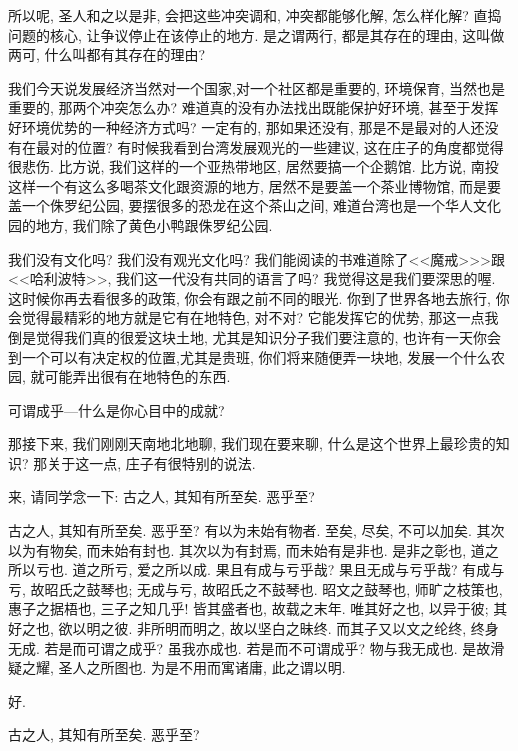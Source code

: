 \documentclass[11pt]{article}
\begin{document}
所以呢, {\color{blue} 圣人和之以是非}, 会把这些冲突调和, 冲突都能够化解, 怎么样化解? 直捣问题的核心, 让争议停止在该停止的地方. {\color{blue} 是之谓两行}, 都是其存在的理由, 这叫做两可, 什么叫都有其存在的理由? 

我们今天说发展经济当然对一个国家,对一个社区都是重要的, 环境保育, 当然也是重要的, 那两个冲突怎么办? 难道真的没有办法找出既能保护好环境, 甚至于发挥好环境优势的一种经济方式吗? 一定有的, 那如果还没有, 那是不是最对的人还没有在最对的位置? 有时候我看到台湾发展观光的一些建议, 这在庄子的角度都觉得很悲伤. 比方说, 我们这样的一个亚热带地区, 居然要搞一个企鹅馆. 比方说, 南投这样一个有这么多喝茶文化跟资源的地方, 居然不是要盖一个茶业博物馆, 而是要盖一个侏罗纪公园, 要摆很多的恐龙在这个茶山之间, 难道台湾也是一个华人文化园的地方, 我们除了黄色小鸭跟侏罗纪公园. 

我们没有文化吗? 我们没有观光文化吗? 我们能阅读的书难道除了<<魔戒>>>跟<<哈利波特>>, 我们这一代没有共同的语言了吗? 我觉得这是我们要深思的喔. 这时候你再去看很多的政策, 你会有跟之前不同的眼光. 你到了世界各地去旅行, 你会觉得最精彩的地方就是它有在地特色, 对不对? 它能发挥它的优势, 那这一点我倒是觉得我们真的很爱这块土地, 尤其是知识分子我们要注意的, 也许有一天你会到一个可以有决定权的位置,尤其是贵班, 你们将来随便弄一块地, 发展一个什么农园, 就可能弄出很有在地特色的东西. 


{\Large {\color{purple} 可谓成乎---什么是你心目中的成就?}}

那接下来, 我们刚刚天南地北地聊, 我们现在要来聊, 什么是这个世界上最珍贵的知识? 那关于这一点, 庄子有很特别的说法. 

来, 请同学念一下: {\color{blue} 古之人, 其知有所至矣. 恶乎至?}

{\color{blue} 古之人, 其知有所至矣. 恶乎至? 有以为未始有物者. 至矣, 尽矣, 不可以加矣. 其次以为有物矣, 而未始有封也. 其次以为有封焉, 而未始有是非也. 是非之彰也, 道之所以亏也. 道之所亏, 爱之所以成. 果且有成与亏乎哉? 果且无成与亏乎哉? 有成与亏, 故昭氏之鼓琴也; 无成与亏, 故昭氏之不鼓琴也. 昭文之鼓琴也, 师旷之枝策也, 惠子之据梧也, 三子之知几乎! 皆其盛者也, 故载之末年. 唯其好之也, 以异于彼; 其好之也, 欲以明之彼. 非所明而明之, 故以坚白之昧终. 而其子又以文之纶终, 终身无成. 若是而可谓之成乎? 虽我亦成也. 若是而不可谓成乎? 物与我无成也. 是故滑疑之耀, 圣人之所图也. 为是不用而寓诸庸, 此之谓以明.}

好. 
\begin{center}
	{\color{magenta} 古之人, 其知有所至矣. 恶乎至?}
\end{center}
\end{document}
